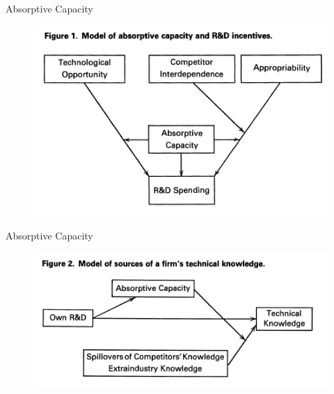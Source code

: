 \documentclass{beamer}
\begin{document}
\begin{frame}{Absorptive Capacity}{}
\begin{figure}[h]
\begin{centering}
  \includegraphics[width=\textwidth]{0401}
   \label{fig:0401}
\end{centering}
\end{figure}
\end{frame}

\begin{frame}{Absorptive Capacity}{}
\begin{figure}[h]
\begin{centering}
  \includegraphics[width=\textwidth]{0402}
   \label{fig:0402}
\end{centering}
\end{figure}
\end{frame}
\end{document}
